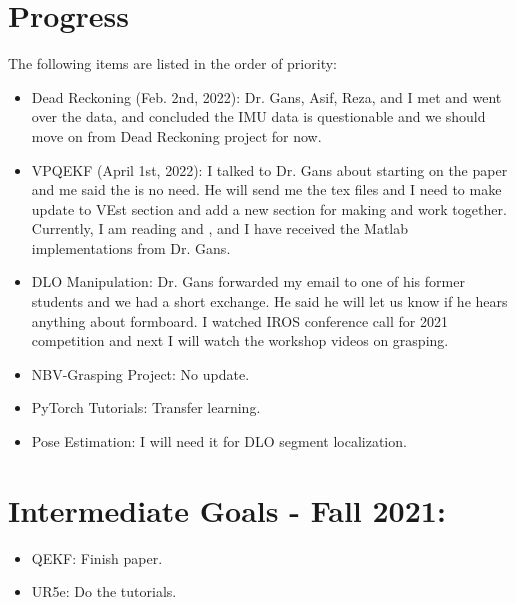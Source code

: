 \documentclass[11pt]{article}
\begin{document}
\section{Progress}
The following items are listed in the order of priority:
\begin{itemize}
      \item Dead Reckoning (Feb. 2nd, 2022): Dr. Gans, Asif, Reza, and I met and
      went over the data, and concluded the IMU data is questionable and we
      should move on from Dead Reckoning project for now.
      \item VPQEKF (April 1st, 2022): I talked to Dr. Gans about starting on the
      paper and me said the is no need. He will send me the tex files and I
      need to make update to VEst section and add a new section for making
      \cite{quest} and \cite{vest} work together. Currently, I am reading
      \cite{quest} and \cite{vest}, and I have received the Matlab
      implementations from Dr. Gans.
      \item DLO Manipulation: Dr. Gans forwarded my email to one of his former
      students and we had a short exchange. He said he will let us know if he
      hears anything about formboard. I watched IROS conference call for 2021
      competition and next I will watch the workshop videos on grasping.
      \item NBV-Grasping Project: No update.
      \item PyTorch Tutorials: Transfer learning.
      \item Pose Estimation: I will need it for DLO segment localization.
\end{itemize}

\section{Intermediate Goals - Fall 2021:}
\begin{itemize}
      \item QEKF: Finish paper.
      \item UR5e: Do the tutorials.
\end{itemize}

\newpage

\newpage


\end{document}
